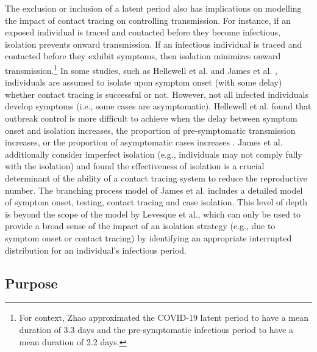 \documentclass[sr]{drdc-report}
\begin{document}
The exclusion or inclusion of a latent period also has implications on modelling the impact of contact tracing on controlling transmission. For instance, if an exposed individual is traced and contacted before they become infectious, isolation prevents onward transmission. If an infectious individual is traced and contacted before they exhibit symptoms, then isolation minimizes onward transmission.{\footnote{For context, Zhao \cite{Zhao} approximated the COVID-19 latent period to have a mean duration of 3.3 days and the pre-symptomatic infectious period to have a mean duration of 2.2 days.}} In some studies, such as Hellewell et al. \cite{Hellewell} and James et al. \cite{James}, individuals are assumed to isolate upon symptom onset (with some delay) whether contact tracing is successful or not. However, not all infected individuals develop symptoms (i.e., some cases are asymptomatic).{\footnotemark} Hellewell et al. \cite{Hellewell} found that outbreak control is more difficult to achieve when the delay between symptom onset and isolation increases, the proportion of pre-symptomatic transmission increases, or the proportion of asymptomatic cases increases \cite{Hellewell}. James et al. \cite{James} additionally consider imperfect isolation (e.g., individuals may not comply fully with the isolation) and found the effectiveness of isolation is a crucial determinant of the ability of a contact tracing system to reduce the reproductive number. The branching process model of James et al. \cite{James} includes a detailed model of symptom onset, testing, contact tracing and case isolation. This level of depth is beyond the scope of the model by Levesque et al., which can only be used to provide a broad sense of the impact of an isolation strategy (e.g., due to symptom onset or contact tracing) by identifying an appropriate interrupted distribution for an individual’s infectious period. 



 

\subsection{Purpose} 

 
\end{document}
